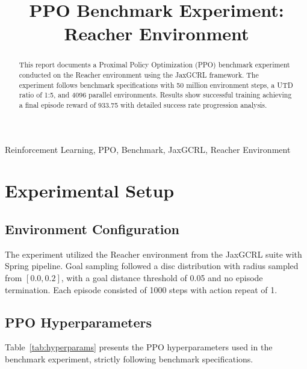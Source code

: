 \documentclass[conference]{IEEEtran}
\begin{document}
\title{PPO Benchmark Experiment: Reacher Environment}

\author{
}

\maketitle

\begin{abstract}
This report documents a Proximal Policy Optimization (PPO) benchmark experiment conducted on the Reacher environment using the JaxGCRL framework. The experiment follows benchmark specifications with 50 million environment steps, a UTD ratio of 1:5, and 4096 parallel environments. Results show successful training achieving a final episode reward of 933.75 with detailed success rate progression analysis.
\end{abstract}

\begin{IEEEkeywords}
Reinforcement Learning, PPO, Benchmark, JaxGCRL, Reacher Environment
\end{IEEEkeywords}

\section{Experimental Setup}

\subsection{Environment Configuration}
The experiment utilized the Reacher environment from the JaxGCRL suite with Spring pipeline. Goal sampling followed a disc distribution with radius sampled from $[0.0, 0.2]$, with a goal distance threshold of 0.05 and no episode termination. Each episode consisted of 1000 steps with action repeat of 1.

\subsection{PPO Hyperparameters}
Table~\ref{tab:hyperparams} presents the PPO hyperparameters used in the benchmark experiment, strictly following benchmark specifications.
\end{document}

